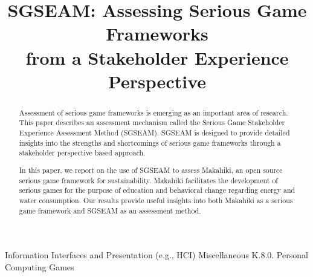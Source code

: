 \documentclass{sigchi}
\begin{document}
\title{SGSEAM: Assessing Serious Game Frameworks\\ from a Stakeholder Experience Perspective}


\maketitle

\begin{abstract}
Assessment of serious game frameworks is emerging as an important area of research.
This paper describes an assessment mechanism called the Serious Game Stakeholder Experience
Assessment Method (SGSEAM). SGSEAM is designed to provide detailed insights into the strengths
and shortcomings of serious game frameworks through a stakeholder perspective based approach.

In this paper, we report on the use of SGSEAM to assess Makahiki, an open source serious game
framework for sustainability.  Makahiki facilitates the development of serious games for the
purpose of education and behavioral change regarding energy and water consumption. Our results
provide useful insights into both Makahiki as a serious game framework and SGSEAM as an
assessment method.
\end{abstract}


 {Information Interfaces and Presentation (e.g., HCI)} {Miscellaneous} {K.8.0.} {Personal Computing} {Games}

\end{document}
